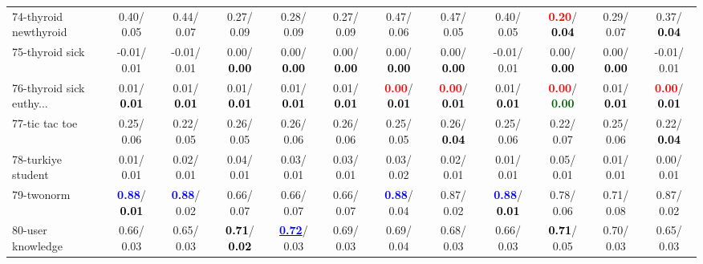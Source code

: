 \begin{table}[h]
\begin{center}
{\begin{tabular}{lc|c|c|c|c|c|c|c|c|c|c}
74-thyroid newthyroid &   0.40/  0.05 &   0.44/  0.07 &   0.27/  0.09 &   0.28/  0.09 &   0.27/  0.09 &   0.47/  0.06 &   0.47/  0.05 &   0.40/  0.05 & \textcolor{red}{\textbf{  0.20}}/\textcolor{black}{\textbf{  0.04}} &   0.29/  0.07 &   0.37/\textcolor{black}{\textbf{  0.04}} \\
75-thyroid sick &  -0.01/  0.01 &  -0.01/  0.01 &   0.00/\textcolor{black}{\textbf{  0.00}} &   0.00/\textcolor{black}{\textbf{  0.00}} &   0.00/\textcolor{black}{\textbf{  0.00}} &   0.00/\textcolor{black}{\textbf{  0.00}} &   0.00/\textcolor{black}{\textbf{  0.00}} &  -0.01/  0.01 &   0.00/\textcolor{black}{\textbf{  0.00}} &   0.00/\textcolor{black}{\textbf{  0.00}} &  -0.01/  0.01 \\
76-thyroid sick euthy... &   0.01/\textcolor{black}{\textbf{  0.01}} &   0.01/\textcolor{black}{\textbf{  0.01}} &   0.01/\textcolor{black}{\textbf{  0.01}} &   0.01/\textcolor{black}{\textbf{  0.01}} &   0.01/\textcolor{black}{\textbf{  0.01}} & \textcolor{red}{\textbf{  0.00}}/\textcolor{black}{\textbf{  0.01}} & \textcolor{red}{\textbf{  0.00}}/\textcolor{black}{\textbf{  0.01}} &   0.01/\textcolor{black}{\textbf{  0.01}} & \textcolor{red}{\textbf{  0.00}}/\textcolor{darkgreen}{\textbf{  0.00}} &   0.01/\textcolor{black}{\textbf{  0.01}} & \textcolor{red}{\textbf{  0.00}}/\textcolor{black}{\textbf{  0.01}} \\
77-tic tac toe &   0.25/  0.06 &   0.22/  0.05 &   0.26/  0.05 &   0.26/  0.06 &   0.26/  0.06 &   0.25/  0.05 &   0.26/\textcolor{black}{\textbf{  0.04}} &   0.25/  0.06 &   0.22/  0.07 &   0.25/  0.06 &   0.22/\textcolor{black}{\textbf{  0.04}} \\
78-turkiye student &   0.01/  0.01 &   0.02/  0.01 &   0.04/  0.01 &   0.03/  0.01 &   0.03/  0.01 &   0.03/  0.02 &   0.02/  0.01 &   0.01/  0.01 &   0.05/  0.01 &   0.01/  0.01 &   0.00/  0.01 \\ \hline
79-twonorm & \textcolor{blue}{\textbf{  0.88}}/\textcolor{black}{\textbf{  0.01}} & \textcolor{blue}{\textbf{  0.88}}/  0.02 &   0.66/  0.07 &   0.66/  0.07 &   0.66/  0.07 & \textcolor{blue}{\textbf{  0.88}}/  0.04 &   0.87/  0.02 & \textcolor{blue}{\textbf{  0.88}}/\textcolor{black}{\textbf{  0.01}} &   0.78/  0.06 &   0.71/  0.08 &   0.87/  0.02 \\
80-user knowledge &   0.66/  0.03 &   0.65/  0.03 & \textcolor{black}{\textbf{  0.71}}/\textcolor{black}{\textbf{  0.02}} & \underline{\textcolor{blue}{\textbf{  0.72}}}/  0.03 &   0.69/  0.03 &   0.69/  0.04 &   0.68/  0.03 &   0.66/  0.03 & \textcolor{black}{\textbf{  0.71}}/  0.05 &   0.70/  0.03 &   0.65/  0.03 \\

\end{tabular}}
\end{center}
\end{table}

